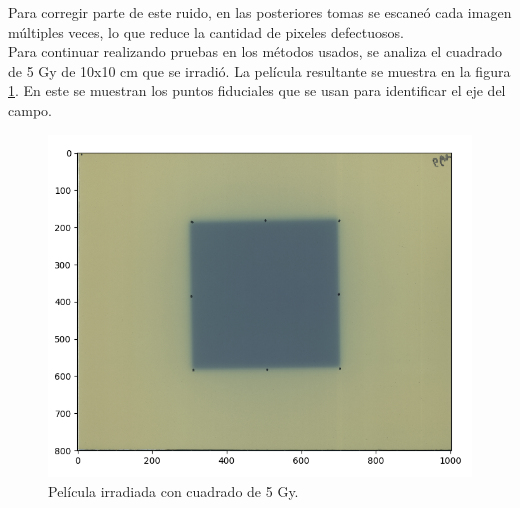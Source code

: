 Para corregir parte de este ruido, en las posteriores tomas se escaneó cada imagen múltiples veces, lo que reduce la cantidad de pixeles defectuosos.\\

Para continuar realizando pruebas en los métodos usados, se analiza el cuadrado de 5 Gy de 10x10 cm que se irradió. La película resultante se muestra en la figura \ref{fig:cuadrado5Gy}. En este se muestran los puntos fiduciales que se usan para identificar el eje del campo.\\

\begin{figure}[H]
	\centering
	\includegraphics[width=0.7\linewidth]{images/peliculaCuadrado.png}
	\caption{Película irradiada con cuadrado de 5 Gy. }
	\label{fig:cuadrado5Gy}
\end{figure}

